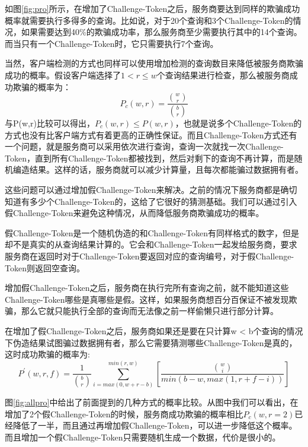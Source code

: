 如图\ref{fig:pro}所示，在增加了Challenge-Token之后，服务商要达到同样的欺骗成功概率就需要执行多得多的查询。比如说，对于20个查询和3个Challenge-Token的情况，如果需要达到40\%的欺骗成功率，那么服务商至少需要执行其中的14个查询。而当只有一个Challenge-Token时，它只需要执行7个查询。

当然，客户端检测的方式也同样可以使用增加检测的查询数目来降低被服务商欺骗成功的概率。假设客户端选择了$1 < r \le w$个查询结果进行检查，那么被服务商成功欺骗的概率为：
\begin{equation} P_c(w,r) = \frac{\binom{w}{r}}{\binom{b}{r}} \end{equation}
与P(w,r)比较可以得出，$P_c(w,r) \le P(w,r)$，也就是说多个Challenge-Token的方式也没有比客户端方式有着更高的正确性保证。而且Challenge-Token方式还有一个问题，就是服务商可以采用依次进行查询，查询一次就找一次Challenge-Token，直到所有Challenge-Token都被找到，然后对剩下的查询不再计算，而是随机编造结果。这样的话，服务商就可以减少计算量，且每次都能骗过数据拥有者。

这些问题可以通过增加假Challenge-Token来解决。之前的情况下服务商都是确切知道有多少个Challenge-Token的，这给了它很好的猜测基础。我们可以通过引入假Challenge-Token来避免这种情况，从而降低服务商欺骗成功的概率。

假Challenge-Token是一个随机伪造的和Challenge-Token有同样格式的数字，但是却不是真实的从查询结果计算的。它会和Challenge-Token一起发给服务商，要求服务商在返回时对于Challenge-Token要返回对应的查询编号，对于假Challenge-Token则返回空查询。

增加假Challenge-Token之后，服务商在执行完所有查询之前，就不能知道这些Challenge-Token哪些是真哪些是假。这样，如果服务商想百分百保证不被发现欺骗，那么它就只能执行全部的查询而无法像之前一样偷懒只进行部分计算。

在增加了假Challenge-Token之后，服务商如果还是要在只计算w < b个查询的情况下伪造结果试图骗过数据拥有者，那么它需要猜测哪些Challenge-Token是真的，这时成功欺骗的概率为:
\begin{equation}P^\prime(w,r,f) = \frac{1}{\binom{b}{r}}\sum_{i=max(0,w+r-b)}^{min(r,w)}[\frac{\binom{w}{i}}{min(b-w,max(1,r+f-i))}]\end{equation}


图\ref{fig:allpro}中给出了前面提到的几种方式的概率比较。从图中我们可以看出，在增加了2个假Challenge-Token的时候，服务商成功欺骗的概率相比$P_c(w,r=2)$已经降低了一半，而且通过再增加假Challenge-Token，可以进一步降低这个概率。而且增加一个假Challenge-Token只需要随机生成一个数据，代价是很小的。

